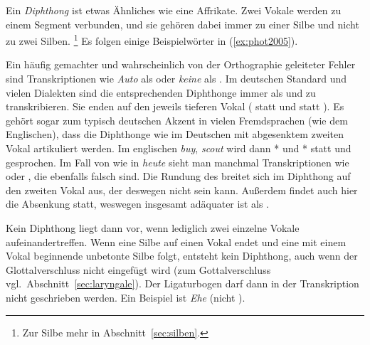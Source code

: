 Ein \textit{Diphthong} ist etwas Ähnliches wie eine Affrikate.
Zwei Vokale werden zu einem Segment verbunden, und sie gehören dabei immer zu einer Silbe und nicht zu zwei Silben.%
\footnote{Zur Silbe mehr in Abschnitt~\ref{sec:silben}.}
Es folgen einige Beispielwörter in (\ref{ex:phot2005}).

\begin{exe}
  \ex\label{ex:phot2005}
  \begin{xlist}
  \end{xlist}
\end{exe}

Ein häufig gemachter und wahrscheinlich von der Orthographie geleiteter Fehler sind Transkriptionen wie \textit{Auto} als \Ast\textipa{[P\t{aU}to]} oder \textit{keine} als \Ast\textipa{[k\t{aI}ne]}.
Im deutschen Standard und vielen Dialekten sind die entsprechenden Diphthonge immer als \textipa{[\t{aE}]} und \textipa{[\t{aO}]} zu transkribieren.
Sie enden auf den jeweils tieferen Vokal (\textipa{[O]} statt \textipa{[U]} und \textipa{[E]} statt \textipa{[I]}).
Es gehört sogar zum typisch deutschen Akzent in vielen Fremdsprachen (wie \zB dem Englischen), dass die Diphthonge wie im Deutschen mit abgesenktem zweiten Vokal artikuliert werden.
Im englischen \textit{buy}, \textit{scout} wird dann *\textipa{[b\t{aE}]} und *\textipa{[sk\t{aO}t]} statt \textipa{[b\t{aI}]} und \textipa{[sk\t{aU}t]} gesprochen.
Im Fall von \textipa{[\t{O\oe}]} wie in \textit{heute} \textipa{[h\t{O\oe}t@]} sieht man manchmal Transkriptionen wie \textipa{[\t{OI}]} oder \textipa{[\t{OY}]}, die ebenfalls falsch sind.
Die Rundung des \textipa{[O]} breitet sich im Diphthong auf den zweiten Vokal aus, der deswegen nicht \textipa{[I]} sein kann.
Außerdem findet auch hier die Absenkung statt, weswegen insgesamt \textipa{[\t{O\oe}]} adäquater ist als \textipa{[\t{OY}]}.

Kein Diphthong liegt dann vor, wenn lediglich zwei einzelne Vokale aufeinandertreffen.
Wenn eine Silbe auf einen Vokal endet und eine mit einem Vokal beginnende unbetonte Silbe folgt, entsteht kein Diphthong, auch wenn der Glottalverschluss nicht eingefügt wird (zum Gottalverschluss vgl.\ Abschnitt~\ref{sec:laryngale}).
Der Ligaturbogen darf dann in der Transkription nicht geschrieben werden.
Ein Beispiel ist \textit{Ehe} \textipa{[Pe:@]} (nicht \Ast\textipa{[P\t{e@}]}).


